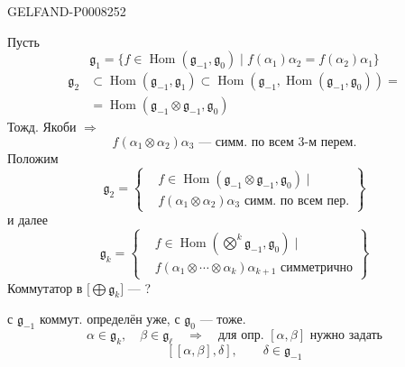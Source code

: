 \begin{GelfandAdjacentEvidence}{GELFAND-P000825}{2}


Пусть
\begin{equation*}
\mathfrak g_1=\{f\in\operatorname{Hom}(\mathfrak g_{-1},\mathfrak g_0)
\mid f(\alpha_1)\alpha_2=f(\alpha_2)\alpha_1\}\tag{9}
\end{equation*}
\begin{equation*}
\begin{aligned}
\mathfrak g_2 &\subset\operatorname{Hom}(\mathfrak g_{-1},\mathfrak g_1)
\subset\operatorname{Hom}(\mathfrak g_{-1},\operatorname{Hom}(\mathfrak g_{-1},\mathfrak g_0))=\\
&=\operatorname{Hom}(\mathfrak g_{-1}\otimes\mathfrak g_{-1},\mathfrak g_0)
\end{aligned}\tag{10}
\end{equation*}
Тожд. Якоби \(\Rightarrow\)
\begin{equation*}
f(\alpha_1\otimes\alpha_2)\alpha_3\text{ — симм. по всем 3-м перем.}\tag{11}
\end{equation*}
Положим
\begin{equation*}
\mathfrak g_2=\left\{\begin{aligned}
&f\in\operatorname{Hom}(\mathfrak g_{-1}\otimes\mathfrak g_{-1},\mathfrak g_0)\mid\\
&f(\alpha_1\otimes\alpha_2)\alpha_3\text{ симм. по всем пер.}
\end{aligned}\right\}\tag{12}
\end{equation*}
и далее
\begin{equation*}
\mathfrak g_k=\left\{\begin{aligned}
&f\in\operatorname{Hom}(\overset{k}{\bigotimes}\mathfrak g_{-1},\mathfrak g_0)\mid\\
&f(\alpha_1\otimes\cdots\otimes\alpha_k)\alpha_{k+1}\text{ симметрично}
\end{aligned}\right\}\tag{13}
\end{equation*}
Коммутатор в \(\bigl[\bigoplus \mathfrak g_k\bigr]\) — ?

с \(\mathfrak g_{-1}\) коммут. определён уже, с \(\mathfrak g_0\) — тоже.
\[
\alpha\in\mathfrak g_k,\quad \beta\in\mathfrak g_\ell\quad\Rightarrow\quad
\text{для опр. }[\alpha,\beta]\text{ нужно задать}
\]
\[
[[\alpha,\beta],\delta],\qquad\delta\in\mathfrak g_{-1}
\]
\end{GelfandAdjacentEvidence}
